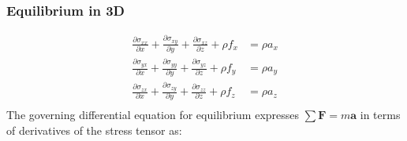 \documentclass[handout]{beamer}
\begin{document}
\begin{frame}
\frametitle{Equilibrium in 3D}

	\begin{align*}
	\frac{\partial \sigma_{xx}}{\partial x} +%
	\frac{\partial \sigma_{xy}}{\partial y} +%
	\frac{\partial \sigma_{xz}}{\partial z} + \rho f_x &= \rho a_x \\
	\frac{\partial \sigma_{yx}}{\partial x} +%
	\frac{\partial \sigma_{yy}}{\partial y} +%
	\frac{\partial \sigma_{yz}}{\partial z} + \rho f_y &= \rho a_y \\
	\frac{\partial \sigma_{zx}}{\partial x} +%
	\frac{\partial \sigma_{zy}}{\partial y} +%
	\frac{\partial \sigma_{zz}}{\partial z} + \rho f_z &= \rho a_z \\
	\end{align*}
The governing differential equation for equilibrium expresses $\sum \mathbf{F}=m\mathbf{a}$ in terms of derivatives of the stress tensor as:
\end{frame}
\end{document}
